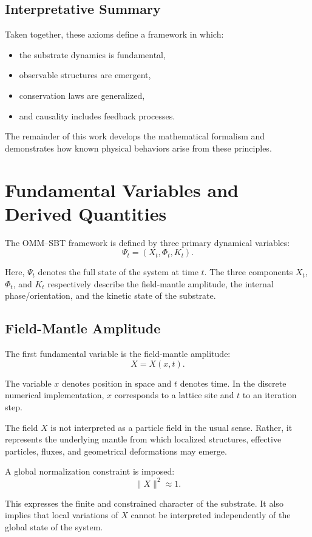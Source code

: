 \documentclass[11pt]{article}
\begin{document}
\subsection{Interpretative Summary}

Taken together, these axioms define a framework in which:
\begin{itemize}
\item the substrate dynamics is fundamental,
\item observable structures are emergent,
\item conservation laws are generalized,
\item and causality includes feedback processes.
\end{itemize}

The remainder of this work develops the mathematical formalism and demonstrates how known physical behaviors arise from these principles.

\section{Fundamental Variables and Derived Quantities}

The OMM--SBT framework is defined by three primary dynamical variables:
\[
\Psi_t = (X_t,\Phi_t,K_t).
\]

Here, $\Psi_t$ denotes the full state of the system at time $t$. The three components $X_t$, $\Phi_t$, and $K_t$ respectively describe the field-mantle amplitude, the internal phase/orientation, and the kinetic state of the substrate.

\subsection{Field-Mantle Amplitude}

The first fundamental variable is the field-mantle amplitude:
\[
X = X(x,t).
\]

The variable $x$ denotes position in space and $t$ denotes time. In the discrete numerical implementation, $x$ corresponds to a lattice site and $t$ to an iteration step.

The field $X$ is not interpreted as a particle field in the usual sense. Rather, it represents the underlying mantle from which localized structures, effective particles, fluxes, and geometrical deformations may emerge.

A global normalization constraint is imposed:
\[
\|X\|^2 \approx 1.
\]

This expresses the finite and constrained character of the substrate. It also implies that local variations of $X$ cannot be interpreted independently of the global state of the system.
\end{document}
